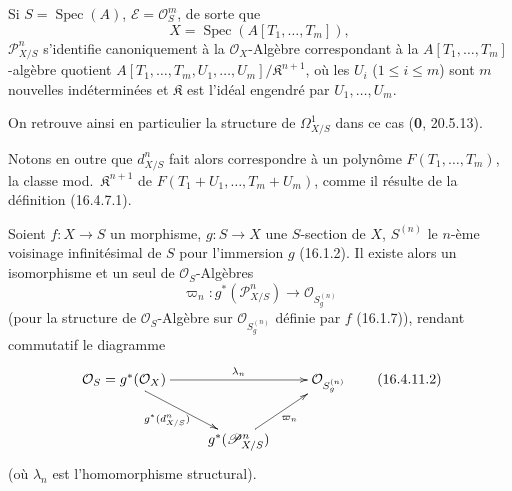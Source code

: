 \begin{corollary}[16.4.10]
\label{IV.16.4.10}
Si $S=\operatorname{Spec}(A)$, $\mathscr{E}=\mathcal{O}_S^m$, de sorte que
\[
  X=\operatorname{Spec}(A[T_1,\ldots,T_m]),
\]
$\mathscr{P}_{X/S}^n$ s'identifie canoniquement à la
$\mathcal{O}_X$-Algèbre correspondant à la $A[T_1,\ldots,T_m]$-algèbre quotient
$A[T_1,\ldots,T_m,U_1,\ldots,U_m]/\mathfrak{K}^{n+1}$, où les $U_i$ \textup{(}$1\leq i\leq m$\textup{)} sont $m$ nouvelles indéterminées et
$\mathfrak{K}$ est l'idéal engendré par $U_1,\ldots,U_m$.
\end{corollary}

On retrouve ainsi en particulier la structure de $\varOmega_{X/S}^1$ dans ce cas
(\textbf{0}, 20.5.13).

Notons en outre que $d_{X/S}^n$ fait alors correspondre à un polynôme
$F(T_1,\ldots,T_m)$, la classe mod.\ $\mathfrak{K}^{n+1}$ de
$F(T_1+U_1,\ldots,T_m+U_m)$, comme il résulte de la définition (16.4.7.1).

\begin{proposition}[16.4.11]
\label{IV.16.4.11}
Soient $f:X\to S$ un morphisme, $g:S\to X$ une $S$-section de $X$,
$S^{(n)}$ le $n$-ème voisinage infinitésimal de $S$ pour l'immersion $g$
\textup{(16.1.2)}. Il existe alors un isomorphisme et un seul de
$\mathcal{O}_S$-Algèbres
\[
  \varpi_n:g^*(\mathscr{P}_{X/S}^n)\longrightarrow
  \mathcal{O}_{S_g^{(n)}}
  \tag{16.4.11.1}
  \label{IV.16.4.11.1}
\]
(pour la structure de $\mathcal{O}_S$-Algèbre sur
$\mathcal{O}_{S_g^{(n)}}$ définie par $f$ \textup{(16.1.7)}), rendant commutatif le
diagramme
\[
  \xymatrix{
    \mathcal{O}_S=g^*(\mathcal{O}_X)
      \ar[rr]^-{\lambda_n}\ar[dr]_-{g^*(d_{X/S}^n)}
      &&\mathcal{O}_{S_g^{(n)}}\\
    &g^*(\mathscr{P}_{X/S}^n)\ar[ur]_-{\varpi_n}
  }
  \tag{16.4.11.2}
  \label{IV.16.4.11.2}
\]
(où $\lambda_n$ est l'homomorphisme structural).
\end{proposition}

